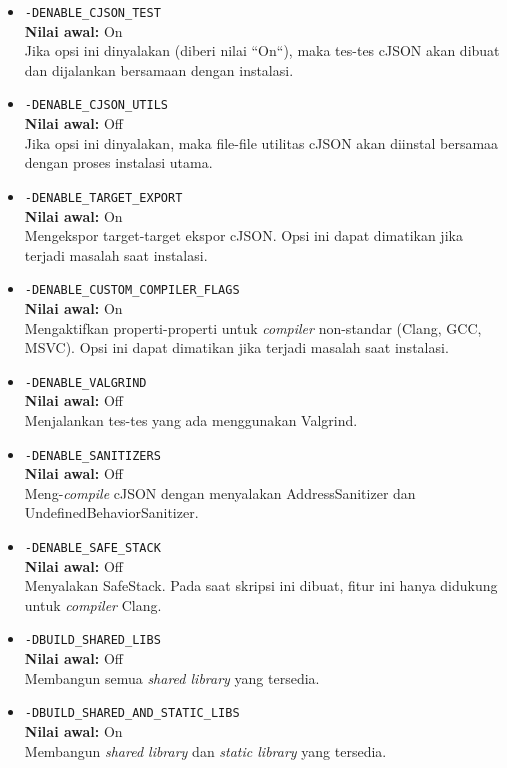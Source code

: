 \begin{itemize}[listparindent=\parindent]
	\begin{itemize}
		\item \verb|-DENABLE_CJSON_TEST|\\
		\textbf{Nilai awal:} On\\
		Jika opsi ini dinyalakan (diberi nilai ``On``), maka tes-tes cJSON akan dibuat dan dijalankan bersamaan dengan instalasi.
		\item \verb|-DENABLE_CJSON_UTILS|\\
		\textbf{Nilai awal:} Off\\
		Jika opsi ini dinyalakan, maka file-file utilitas cJSON akan diinstal bersamaa dengan proses instalasi utama.
		\item \verb|-DENABLE_TARGET_EXPORT|\\
		\textbf{Nilai awal:} On\\
		Mengekspor target-target ekspor cJSON. Opsi ini dapat dimatikan jika terjadi masalah saat instalasi.
		\item \verb|-DENABLE_CUSTOM_COMPILER_FLAGS|\\
		\textbf{Nilai awal:} On\\
		Mengaktifkan properti-properti untuk \textit{compiler} non-standar (Clang, GCC, MSVC). Opsi ini dapat dimatikan jika terjadi masalah saat instalasi.
		\item \verb|-DENABLE_VALGRIND|\\
		\textbf{Nilai awal:} Off\\
		Menjalankan tes-tes yang ada menggunakan \mbox{Valgrind}.
		\item \verb|-DENABLE_SANITIZERS|\\
		\textbf{Nilai awal:} Off\\
		Meng-\textit{compile} cJSON dengan menyalakan \mbox{AddressSanitizer} dan \mbox{UndefinedBehaviorSanitizer}.
		\item \verb|-DENABLE_SAFE_STACK|\\
		\textbf{Nilai awal:} Off\\
		Menyalakan SafeStack. Pada saat skripsi ini dibuat, fitur ini hanya didukung untuk \textit{compiler} Clang.
		\item \verb|-DBUILD_SHARED_LIBS|\\
		\textbf{Nilai awal:} Off\\
		Membangun semua \textit{shared library} yang tersedia.
		\item \verb|-DBUILD_SHARED_AND_STATIC_LIBS|\\
		\textbf{Nilai awal:} On\\
		Membangun \textit{shared library} dan \textit{static library} yang tersedia.

\end{itemize}
\end{itemize}
